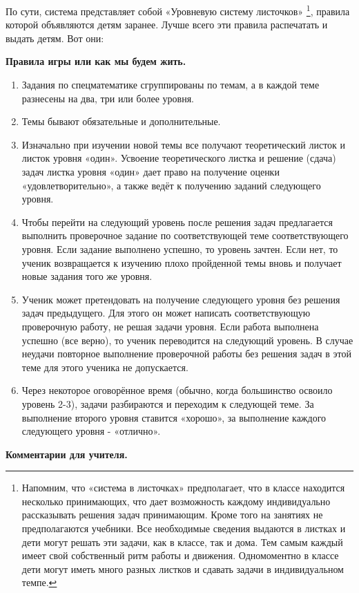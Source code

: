 	По сути, система представляет собой «Уровневую систему листочков» \footnote{ Напомним, что «система в листочках» предполагает, что в классе находится несколько принимающих, что дает возможность каждому индивидуально рассказывать решения задач принимающим. Кроме того на занятиях не предполагаются учебники. Все необходимые сведения выдаются в листках и дети могут решать эти задачи, как в классе, так и дома. Тем самым каждый имеет свой собственный ритм работы и движения. Одномоментно в классе дети могут иметь много разных листков и сдавать задачи в индивидуальном темпе.}, правила которой объявляются детям заранее.	Лучше всего эти правила распечатать и выдать детям. Вот они:
	\begin{center}
		\textbf{Правила игры или как мы будем жить.}
	\end{center}
\begin{enumerate}
	\item Задания по спецматематике сгруппированы по темам, а в каждой теме разнесены на два, три или более уровня.
	\item Темы бывают обязательные и дополнительные. 
	\item Изначально при изучении новой темы все получают теоретический листок и листок уровня «один». Усвоение теоретического листка и решение (сдача) задач листка уровня «один» дает право на получение оценки «удовлетворительно», а также ведёт к  получению заданий следующего уровня.
	\item Чтобы перейти на следующий уровень после решения задач предлагается выполнить проверочное задание по соответствующей теме соответствующего уровня. Если задание выполнено успешно, то уровень зачтен. Если нет, то ученик возвращается к изучению плохо пройденной темы вновь и получает новые задания того же уровня.
	\item Ученик может претендовать на получение следующего уровня без решения задач предыдущего. Для этого он может написать соответствующую проверочную работу, не решая задачи уровня. Если работа выполнена успешно (все верно), то ученик переводится на следующий уровень. В случае неудачи повторное выполнение проверочной работы без решения задач в этой теме для этого ученика не допускается.
	\item Через некоторое оговорённое время (обычно, когда большинство освоило уровень 2-3), задачи разбираются и переходим к следующей теме. За выполнение второго уровня ставится «хорошо», за выполнение каждого следующего уровня - «отлично».
	\end{enumerate}
\newpage
\begin{center}
	\textbf{Комментарии для учителя.}
\end{center}

